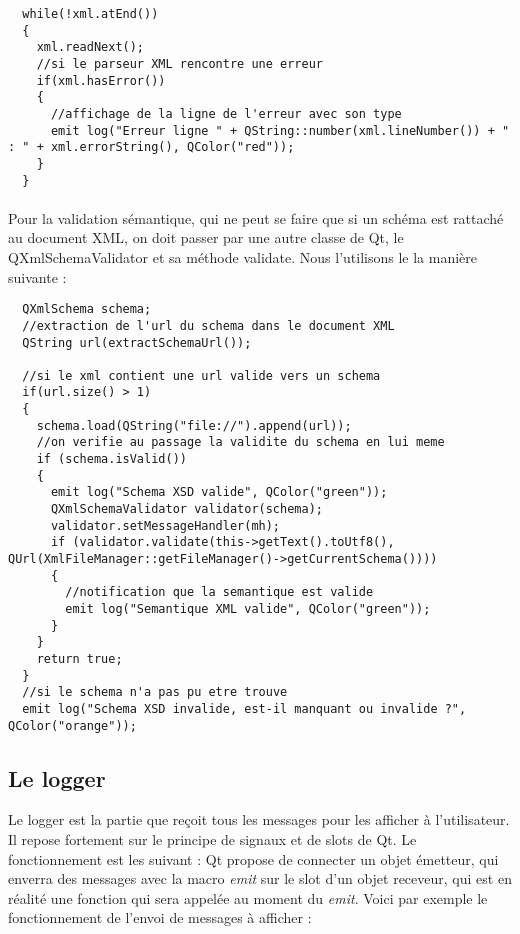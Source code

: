 \begin{lstlisting}
  while(!xml.atEnd())
  {
    xml.readNext();
    //si le parseur XML rencontre une erreur
    if(xml.hasError())
    {
      //affichage de la ligne de l'erreur avec son type
      emit log("Erreur ligne " + QString::number(xml.lineNumber()) + " : " + xml.errorString(), QColor("red"));
    }
  }
\end{lstlisting}
\paragraph{}
Pour la validation sémantique, qui ne peut se faire que si un schéma est rattaché au document XML, on doit passer par une autre classe de Qt, le QXmlSchemaValidator et sa méthode validate. Nous l'utilisons le la manière suivante :
\begin{lstlisting}
  QXmlSchema schema;
  //extraction de l'url du schema dans le document XML
  QString url(extractSchemaUrl());

  //si le xml contient une url valide vers un schema
  if(url.size() > 1)
  {
    schema.load(QString("file://").append(url));
    //on verifie au passage la validite du schema en lui meme
    if (schema.isValid())
    {
      emit log("Schema XSD valide", QColor("green"));
      QXmlSchemaValidator validator(schema);
      validator.setMessageHandler(mh);
      if (validator.validate(this->getText().toUtf8(), QUrl(XmlFileManager::getFileManager()->getCurrentSchema())))
      {
        //notification que la semantique est valide
        emit log("Semantique XML valide", QColor("green"));
      }
    }
    return true;
  }
  //si le schema n'a pas pu etre trouve
  emit log("Schema XSD invalide, est-il manquant ou invalide ?", QColor("orange"));
\end{lstlisting}
\paragraph{}
\subsection{Le logger}
Le logger est la partie que reçoit tous les messages pour les afficher à l'utilisateur. Il repose fortement sur le principe de signaux et de slots de Qt. Le fonctionnement est les suivant : Qt propose de connecter un objet émetteur, qui enverra des messages avec la macro \textit{emit} sur le slot d'un objet receveur, qui est en réalité une fonction qui sera appelée au moment du \textit{emit}. Voici par exemple le fonctionnement de l'envoi de messages à afficher :

